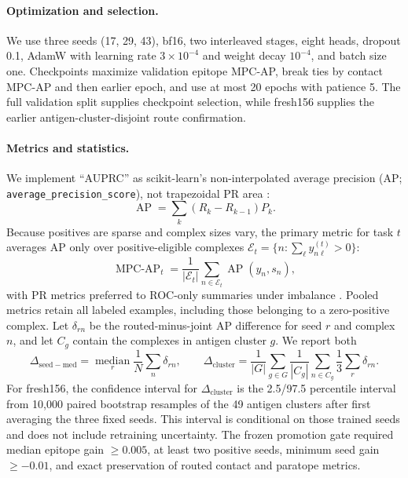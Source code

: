 \documentclass[10pt]{article}
\newcommand{\mpcap}{MPC-AP}
\begin{document}
\paragraph{Optimization and selection.}
We use three seeds (17, 29, 43), bf16, two interleaved stages, eight heads,
dropout 0.1, AdamW \citep{loshchilov2019adamw} with learning rate
$3\times10^{-4}$ and weight decay $10^{-4}$, and batch size one. Checkpoints
maximize validation epitope \mpcap{}, break ties by contact \mpcap{} and then
earlier epoch, and use at most 20 epochs with
patience 5. The full validation split supplies checkpoint selection, while
fresh156 supplies the earlier antigen-cluster-disjoint route confirmation.

\paragraph{Metrics and statistics.}
We implement ``AUPRC'' as scikit-learn's non-interpolated average precision
(AP; \texttt{average\_precision\_score}), not trapezoidal PR area
\citep{pedregosa2011scikit}:
\begin{equation}
 \operatorname{AP}=\sum_k (R_k-R_{k-1})P_k.
 \label{eq:ap}
\end{equation}
Because positives are sparse and complex sizes vary, the primary metric for task
$t$ averages AP only over positive-eligible complexes
$\mathcal{E}_t=\{n:\sum_\ell y_{n\ell}^{(t)}>0\}$:
\begin{equation}
 \operatorname{MPC\text{-}AP}_t=\frac1{|\mathcal{E}_t|}
 \sum_{n\in\mathcal{E}_t}
 \operatorname{AP}(y_n,s_n),
 \label{eq:mpc}
\end{equation}
with PR metrics preferred to ROC-only summaries under imbalance
\citep{saito2015precision}. Pooled metrics retain all labeled examples, including
those belonging to a zero-positive complex.
Let $\delta_{rn}$ be the routed-minus-joint AP difference for seed $r$ and
complex $n$, and let $C_g$ contain the complexes in antigen cluster $g$. We
report both
\begin{equation}
 \Delta_{\mathrm{seed-med}}=\operatorname*{median}_r
 \frac1N\sum_n\delta_{rn}, \qquad
 \Delta_{\mathrm{cluster}}=\frac1{|G|}\sum_{g\in G}\frac1{|C_g|}
 \sum_{n\in C_g}\frac13\sum_r\delta_{rn}.
 \label{eq:estimands}
\end{equation}
For fresh156, the confidence interval for $\Delta_{\mathrm{cluster}}$ is the
2.5/97.5 percentile interval from 10,000 paired bootstrap resamples of the 49
antigen clusters after first averaging the three fixed seeds. This interval is
conditional on those trained seeds and does not include retraining uncertainty.
The frozen promotion gate required median epitope gain
$\geq0.005$, at least two positive seeds, minimum seed gain $\geq-0.01$, and
exact preservation of routed contact and paratope metrics.
\end{document}
